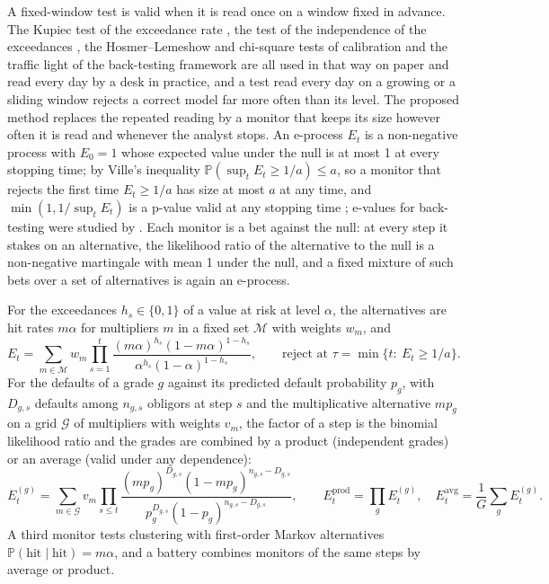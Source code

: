 A fixed-window test is valid when it is read once on a window fixed in advance. The Kupiec test of the exceedance rate \citep{market:kupiec1995}, the test of the independence of the exceedances \citep{market:christoffersen1998}, the Hosmer--Lemeshow and chi-square tests of calibration and the traffic light of the back-testing framework \citep{market:bcbsmar32} are all used in
that way on paper and read every day by a desk in practice, and a test read every day on a growing or a sliding window rejects a correct model far more often than its level. The proposed method replaces the repeated reading by a monitor that keeps its size however often it is read and whenever the analyst stops.
An e-process $E_t$ is a non-negative process with $E_0=1$ whose expected value under the null is at most 1 at every stopping time; by Ville's inequality $\mathbb P(\sup_t E_t\ge 1/a)\le a$, so a monitor that rejects the first time $E_t\ge 1/a$ has size at most $a$ at any time, and $\min(1,1/\sup_t E_t)$ is a p-value valid at any stopping time
\citep{proposed:ramdas2023}; e-values for back-testing were studied by \citet{proposed:wang2022}. Each monitor is a bet against the null: at every step it stakes on an alternative, the likelihood ratio of the alternative to the null is a non-negative martingale with mean 1 under the null, and a fixed mixture of such bets over a set of alternatives is again an e-process.

For the exceedances $h_s\in\{0,1\}$ of a value at risk at level $\alpha$, the alternatives are hit rates $m\alpha$ for multipliers $m$ in a fixed set $\mathcal M$ with weights $w_m$, and
\begin{equation}
E_t=\sum_{m\in\mathcal M}w_m\prod_{s=1}^{t}\frac{(m\alpha)^{h_s}(1-m\alpha)^{1-h_s}}{\alpha^{h_s}(1-\alpha)^{1-h_s}},\qquad \text{reject at }\tau=\min\{t:\ E_t\ge 1/a\}.
\label{eq:bs15-eprocess}
\end{equation}
For the defaults of a grade $g$ against its predicted default probability $p_{g}$, with $D_{g,s}$ defaults among $n_{g,s}$ obligors at step $s$ and the multiplicative alternative $m p_g$ on a grid $\mathcal G$ of multipliers with weights $v_m$, the factor of a step is the binomial likelihood ratio and the grades are combined by a product (independent grades) or an average (valid under any dependence):
\begin{equation}
E^{(g)}_t=\sum_{m\in\mathcal G}v_m\prod_{s\le t}\frac{(m p_g)^{D_{g,s}}(1-m p_g)^{n_{g,s}-D_{g,s}}}{p_g^{D_{g,s}}(1-p_g)^{n_{g,s}-D_{g,s}}},\qquad
E^{\mathrm{prod}}_t=\prod_{g}E^{(g)}_t,\quad E^{\mathrm{avg}}_t=\frac1G\sum_{g}E^{(g)}_t.
\label{eq:bs15-grades}
\end{equation}
A third monitor tests clustering with first-order Markov alternatives $\mathbb P(\text{hit}\mid\text{hit})=m\alpha$, and a battery combines monitors of the same steps by average or product.

